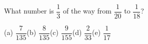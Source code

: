 What number is $\dfrac{1}{3}$ of the way from $\dfrac{1}{20}$ to $\dfrac{1}{18}$?

(a) $\dfrac{7}{135}$\quad (b) $\dfrac{8}{135}$\quad (c) $\dfrac{9}{155}$\quad (d) $\dfrac{2}{33}$\quad (e) $\dfrac{1}{17}$
